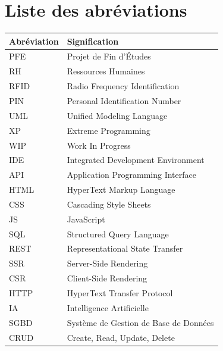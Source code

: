 \clearpage


\chapter*{Liste des abréviations}
\thispagestyle{empty}
\addtocounter{page}{-1}
\begin{table}[H]
\centering
\renewcommand{\arraystretch}{1.4}
\begin{tabular}{lp{10cm}}
\toprule
\textbf{Abréviation} & \textbf{Signification} \\
\midrule
PFE  & Projet de Fin d'Études \\
RH   & Ressources Humaines \\
RFID & Radio Frequency Identification \\
PIN  & Personal Identification Number \\
UML  & Unified Modeling Language \\
XP   & Extreme Programming \\
WIP  & Work In Progress \\
IDE  & Integrated Development Environment \\
API  & Application Programming Interface \\
HTML & HyperText Markup Language \\
CSS  & Cascading Style Sheets \\
JS   & JavaScript \\
SQL  & Structured Query Language \\
REST & Representational State Transfer \\
SSR  & Server-Side Rendering \\
CSR  & Client-Side Rendering \\
HTTP & HyperText Transfer Protocol \\
IA   & Intelligence Artificielle \\
SGBD & Système de Gestion de Base de Données \\
CRUD & Create, Read, Update, Delete \\
\bottomrule
\end{tabular}
\end{table}

\clearpage